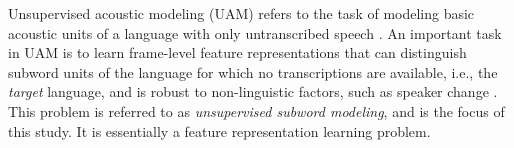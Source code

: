 \documentclass[a4paper]{article}
\begin{document}
Unsupervised acoustic modeling (UAM) refers to the task of modeling basic acoustic units of a language with only untranscribed speech \cite{chen2015parallel,heck2017feature,Kamper2017segmental,Tjandra2019,Feng2019combining,Ondel2019Bayesian}. %
An important task in UAM is to learn frame-level feature representations that can distinguish subword units of the language for which no transcriptions are available, i.e., the \textit{target} language, and is 
robust to non-linguistic factors, such as speaker change \cite{versteegh2015zero,dunbar2017zero}. This problem is referred to as \textit{unsupervised subword modeling}, and is the focus of this study. It is essentially a feature representation learning problem.

\end{document}
